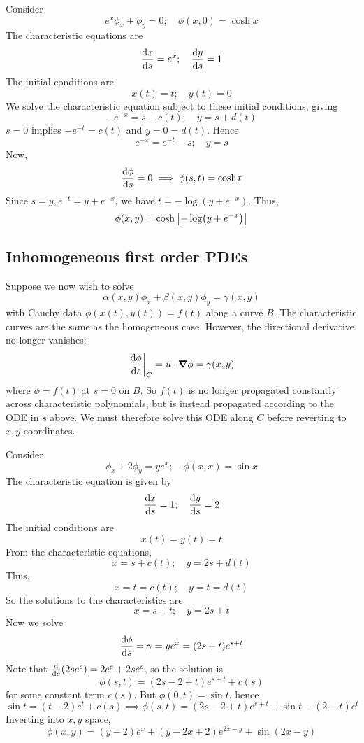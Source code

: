 \begin{example}
	Consider
	\[
		e^x \phi_x + \phi_y = 0;\quad \phi(x,0) = \cosh x
	\]
	The characteristic equations are
	\[
		\dv{x}{s} = e^x;\quad \dv{y}{s} = 1
	\]
	The initial conditions are
	\[
		x(t) = t;\quad y(t) = 0
	\]
	We solve the characteristic equation subject to these initial conditions, giving
	\[
		-e^{-x} = s + c(t);\quad y = s + d(t)
	\]
	\( s = 0 \) implies \( -e^{-t} = c(t) \) and \( y = 0 = d(t) \).
	Hence
	\[
		e^{-x} = e^{-t} - s;\quad y = s
	\]
	Now,
	\[
		\dv{\phi}{s} = 0 \implies \phi(s,t) = \cosh t
	\]
	Since \( s = y, e^{-t} = y + e^{-x} \), we have \( t = -\log(y + e^{-x}) \).
	Thus,
	\[
		\phi(x,y) = \cosh\qty[-\log(y + e^{-x})]
	\]
\end{example}

\subsection{Inhomogeneous first order PDEs}
Suppose we now wish to solve
\[
	\alpha(x,y) \phi_x + \beta(x,y) \phi_y = \gamma(x,y)
\]
with Cauchy data \( \phi(x(t), y(t)) = f(t) \) along a curve \( B \).
The characteristic curves are the same as the homogeneous case.
However, the directional derivative no longer vanishes:
\[
	\eval{\dv{\phi}{s}}_C = u \cdot \grad{\phi} = \gamma(x,y)
\]
where \( \phi = f(t) \) at \( s = 0 \) on \( B \).
So \( f(t) \) is no longer propagated constantly across characteristic polynomials, but is instead propagated according to the ODE in \( s \) above.
We must therefore solve this ODE along \( C \) before reverting to \( x,y \) coordinates.
\begin{example}
	Consider
	\[
		\phi_x + 2 \phi_y = ye^x;\quad \phi(x,x) = \sin x
	\]
	The characteristic equation is given by
	\[
		\dv{x}{s} = 1;\quad \dv{y}{s} = 2
	\]
	The initial conditions are
	\[
		x(t) = y(t) = t
	\]
	From the characteristic equations,
	\[
		x = s + c(t);\quad y = 2s + d(t)
	\]
	Thus,
	\[
		x = t = c(t);\quad y = t = d(t)
	\]
	So the solutions to the characteristics are
	\[
		x = s + t;\quad y = 2s + t
	\]
	Now we solve
	\[
		\dv{\phi}{s} = \gamma = y e^x = (2s+t)e^{s+t}
	\]
	Note that \( \dv{s} \qty(2se^s) = 2e^s + 2se^s \), so the solution is
	\[
		\phi(s,t) = (2s - 2 + t)e^{s+t} + c(s)
	\]
	for some constant term \( c(s) \).
	But \( \phi(0,t) = \sin t \), hence
	\[
		\sin t = (t-2)e^t + c(s) \implies \phi(s,t) = (2s-2+t)e^{s+t} + \sin t - (2-t)e^t
	\]
	Inverting into \( x,y \) space,
	\[
		\phi(x,y) = (y-2)e^x + (y-2x+2)e^{2x-y} + \sin(2x-y)
	\]
\end{example}

